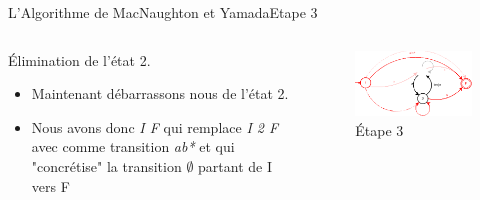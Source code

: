 \documentclass{beamer}
\begin{document}
\begin{frame}{L'Algorithme de MacNaughton et Yamada}{Etape 3}
     \begin{columns}[T]
     \begin{column}{.48\textwidth}
         {\fontsize{8}{9}\selectfont Élimination de l'état 2.}
         \begin{itemize}
         
             \item {\fontsize{7}{8}\selectfont Maintenant débarrassons nous de l'état 2.}
             \item {\fontsize{7}{8}\selectfont Nous avons donc \textit{I F} qui remplace \textit{I 2 F} avec comme transition \textit{ab*} et qui "concrétise" la transition $\emptyset$ partant de I vers F}
             
         \end{itemize}
     \end{column}
     
     \begin{column}{.48\textwidth}
     \begin{figure}
     \includegraphics[scale=0.37]{Diagramme4_2.png}
     \centering
     \caption{Étape 3}     
     \end{figure}
     \end{column}
        
     \end{columns}
\end{frame}
\end{document}
